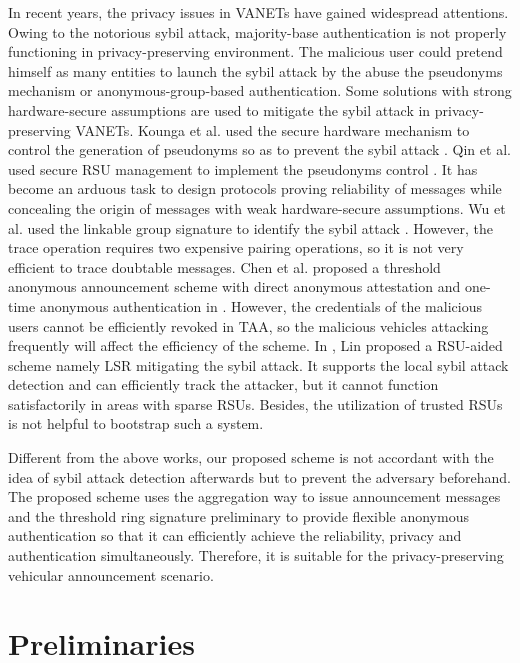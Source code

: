 \documentclass[a4paper]{article}
\begin{document}
In recent years, the privacy issues in VANETs have gained widespread attentions. Owing to the notorious sybil attack, majority-base authentication is not properly functioning in privacy-preserving environment. The malicious user could pretend himself as many entities to launch the sybil attack by the abuse the pseudonyms mechanism or anonymous-group-based authentication. Some solutions with strong hardware-secure assumptions are used to mitigate the sybil attack in privacy-preserving VANETs. Kounga et al. used the secure hardware mechanism to control the generation of pseudonyms so as to prevent the sybil attack \cite{KWL09}. Qin et al. used secure RSU management to implement the pseudonyms control \cite{QWD12}. It has become an arduous task to design protocols proving reliability of messages while concealing the origin of messages with weak hardware-secure assumptions. Wu et al. used the linkable group signature to identify the sybil attack \cite{WDG10}. However, the trace operation requires two expensive pairing operations, so it is not very efficient to trace doubtable messages. Chen et al. proposed a threshold anonymous announcement scheme with direct anonymous attestation and one-time anonymous authentication in \cite{CNW11}. However, the credentials of the malicious users cannot be efficiently revoked in TAA, so the malicious vehicles attacking frequently will affect the efficiency of the scheme. In \cite{Lin13}, Lin proposed a RSU-aided scheme namely LSR mitigating the sybil attack. It supports the local sybil attack detection and can efficiently track the attacker, but it cannot function satisfactorily in areas with sparse RSUs. Besides, the utilization of trusted RSUs is not helpful to bootstrap such a system.

Different from the above works, our proposed scheme is not accordant with the idea of sybil attack detection afterwards but to prevent the adversary beforehand. The proposed scheme uses the aggregation way to issue announcement messages and the threshold ring signature preliminary to provide flexible anonymous authentication so that it can efficiently achieve the reliability, privacy and authentication simultaneously. Therefore, it is suitable for the privacy-preserving vehicular announcement scenario.

\section{Preliminaries}
\end{document}
